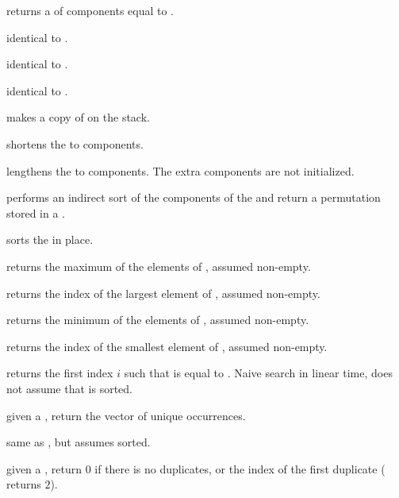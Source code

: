  returns a 
of  components equal to .

 identical to .

 identical to .

 identical to .

 makes a copy of  on the stack.

 shortens the  
to  components.

 lengthens the 
 to  components. The extra components are not initialized.

 performs an indirect sort of the
components of the   and return a permutation stored in a
.

 sorts the   in place.

 returns the maximum of the elements of
 , assumed non-empty.

 returns the index of the largest
element of  , assumed non-empty.

 returns the minimum of the elements of
 , assumed non-empty.

 returns the index of the smallest
element of  , assumed non-empty.

 returns the first index $i$
such that  is equal to . Naive search in linear time, does
not assume that  is sorted.

 given a  , return
the vector of unique occurrences.

 same as , but assumes
  sorted.

 given a  , return
$0$ if there is no duplicates, or the index of the first duplicate
( returns $2$).

